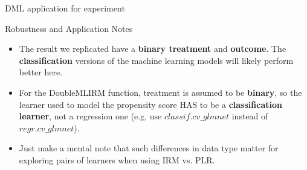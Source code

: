 \documentclass[10pt,table,aspectratio=169]{beamer}
\begin{document}
\begin{frame}[plain, label=two_dimensions]{DML application for experiment}

    \begin{figure}[H]
    \centering
    \begin{subfigure}{0.6\textwidth}
        \centering
    \end{subfigure}
    \end{figure}

\end{frame}

\begin{frame}[plain, label=two_dimensions]{Robustness and Application Notes}
\begin{itemize}
    \item The result we replicated have a \alert{\bf binary treatment} and \alert{\bf outcome}. The \alert{\bf classification} versions of the machine learning models will likely perform better here. \pause \medskip
    \item For the DoubleMLIRM function, treatment is assumed to be \alert{\bf binary}, so the learner used to model the propensity score HAS to be a \alert{\bf classification learner}, not a regression one (e.g. use $classif.cv\_glmnet$  instead of $regr.cv\_glmnet$). \pause  \medskip
    \item Just make a mental note that such differences in data type matter for exploring pairs of learners when using IRM vs. PLR. 
\end{itemize}
    
\end{frame}
\end{document}
